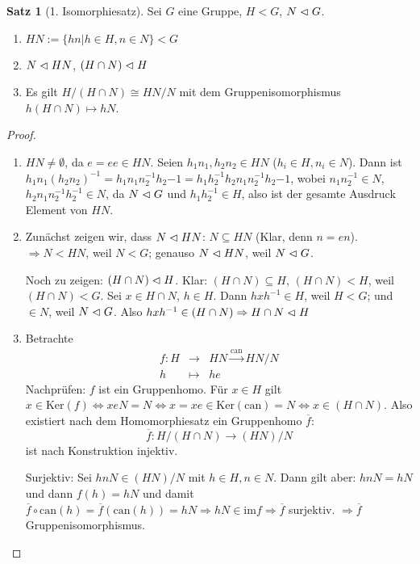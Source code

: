 \documentclass[12pt,a4paper]{article}
\newcounter{thmcounter}[subsection]
\theoremstyle{definition}
\theoremstyle{remark}
\theoremstyle{definition}
\newtheorem{satz}[thmcounter]{Satz}
\theoremstyle{definition}
\theoremstyle{plain}
\theoremstyle{plain}
\begin{document}
\begin{satz}[1. Isomorphiesatz]
	Sei $G$ eine Gruppe, $H<G$, $N\vartriangleleft G$.\begin{enumerate}
		\item $HN:=\{hn|h\in H, n\in N\}<G$
		\item $N\vartriangleleft HN$, $(H\cap N)\vartriangleleft H$
		\item Es gilt $H/(H\cap N) \cong HN/N$ mit dem Gruppenisomorphismus $h(H\cap N)\mapsto hN$.
	\end{enumerate}
\end{satz}	
\begin{proof}
	\leavevmode
	\begin{enumerate}
		\item $HN\neq \emptyset$, da $e = ee\in HN$. Seien $h_1n_1,h_2n_2\in HN$ ($h_i\in H, n_i\in N$). Dann ist $h_1n_1(h_2n_2)^{-1} = h_1n_1n_2^{-1}h_2{-1} = h_1h_2^{-1}h_2n_1n_2^{-1}h_2{-1}$, wobei $n_1n_2^{-1}\in N$, $h_2n_1n_2^{-1}h_2^{-1}\in N$, da $N\vartriangleleft G$ und $h_1h_2^{-1}\in H$, also ist der gesamte Ausdruck Element von $HN$.
		\item Zunächst zeigen wir, dass $N\vartriangleleft HN$: $N\subseteq HN$ (Klar, denn $n = en$). $\Rightarrow N<HN$, weil $N<G$; genauso $N\vartriangleleft HN$, weil $N\vartriangleleft G$.
		
		Noch zu zeigen: $(H\cap N)\vartriangleleft H$. Klar: $(H\cap N)\subseteq H$, $(H\cap N)<H$, weil $(H\cap N)<G$. Sei $x\in H\cap N$, $h\in H$. Dann $hxh^{-1}\in H$, weil $H<G$; und $\in N$, weil $N\vartriangleleft G$. Also $hxh^{-1}\in (H\cap N) \Rightarrow H\cap N\vartriangleleft H$
		\item Betrachte 
		\begin{eqnarray*}
			f\colon H&\to& HN \xrightarrow{\mbox{can}} HN/N\\
			h&\mapsto &he
		\end{eqnarray*}
		Nachprüfen: $f$ ist ein Gruppenhomo. Für $x\in H$ gilt $x\in \mbox{Ker}(f)\Leftrightarrow xeN = N\Leftrightarrow x = xe\in \mbox{Ker}(\mbox{can}) = N\Leftrightarrow x\in (H\cap N)$. Also existiert nach dem Homomorphiesatz ein Gruppenhomo $\overline{f}$:
		$$\overline{f}\colon H/(H\cap N)\to (HN)/N$$ ist nach Konstruktion injektiv.
		
		Surjektiv: Sei $hnN\in (HN)/N$ mit $h\in H, n\in N$. Dann gilt aber: $hnN = hN$ und dann $f(h)=hN$ und damit $\overline{f}\circ\mbox{can}(h) = \overline{f}(\mbox{can}(h)) = hN\Rightarrow hN\in \mbox{im}f\Rightarrow \overline{f}$ surjektiv. $\Rightarrow \overline{f}$ Gruppenisomorphismus.
	\end{enumerate}
\end{proof}
\end{document}
